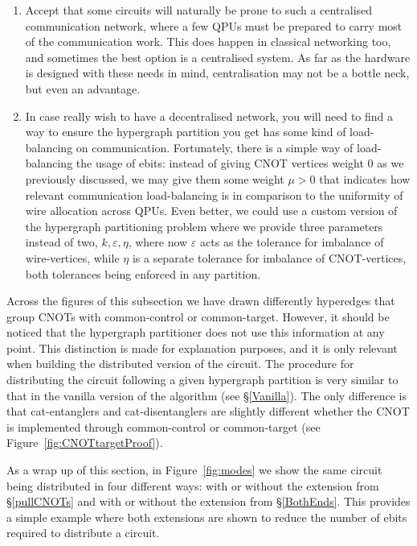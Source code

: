 \begin{enumerate}
\item Accept that some circuits will naturally be prone to such a centralised communication network, where a few QPUs must be prepared to carry most of the communication work. This does happen in classical networking too, and sometimes the best option is a centralised system. As far as the hardware is designed with these needs in mind, centralisation may not be a bottle neck, but even an advantage. 

\item In case really wish to have a decentralised network, you will need to find a way to ensure the hypergraph partition you get has some kind of load-balancing on communication. Fortunately, there is a simple way of load-balancing the usage of ebits: instead of giving CNOT vertices weight \(0\) as we previously discussed, we may give them some weight \(\mu > 0\) that indicates how relevant communication load-balancing is in comparison to the uniformity of wire allocation across QPUs. Even better, we could use a custom version of the hypergraph partitioning problem where we provide three parameters instead of two, \(k,\varepsilon,\eta\), where now \(\varepsilon\) acts as the tolerance for imbalance of wire-vertices, while \(\eta\) is a separate tolerance for imbalance of CNOT-vertices, both tolerances being enforced in any partition.
\end{enumerate}


Across the figures of this subsection we have drawn differently hyperedges that group CNOTs with common-control or common-target. However, it should be noticed that the hypergraph partitioner does not use this information at any point. This distinction is made for explanation purposes, and it is only relevant when building the distributed version of the circuit. The procedure for distributing the circuit following a given hypergraph partition is very similar to that in the vanilla version of the algorithm (see \S\ref{Vanilla}). The only difference is that cat-entanglers and cat-disentanglers are slightly different whether the CNOT is implemented through common-control or common-target (see Figure~\ref{fig:CNOTtargetProof}).

As a wrap up of this section, in Figure~\ref{fig:modes} we show the same circuit being distributed in four different ways: with or without the extension from \S\ref{pullCNOTs} and with or without the extension from \S\ref{BothEnds}. This provides a simple example where both extensions are shown to reduce the number of ebits required to distribute a circuit.

